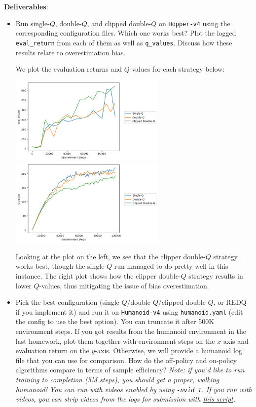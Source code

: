 \textbf{Deliverables}:
\begin{itemize}
    \item Run single-$Q$, double-$Q$, and clipped double-$Q$ on \verb|Hopper-v4| using the corresponding configuration files. Which one works best? Plot the logged \verb|eval_return| from each of them as well as \verb|q_values|. Discuss how these results relate to overestimation bias.
    
    \begin{sol}
        We plot the evaluation returns and $Q$-values for each strategy below:
        \begin{center}
            \includegraphics[width=3in]{../q3.1.5_hopper_evalreturn.png}
            \hspace{0.25cm}
            \includegraphics[width=3in]{../q3.1.5_hopper_qvalues.png}
        \end{center}
        Looking at the plot on the left, we see that the clipper double-$Q$ strategy works best, though the single-$Q$ run managed to do pretty well in this instance. The right plot shows how the clipper double-$Q$ strategy results in lower $Q$-values, thus mitigating the issue of bias overestimation.
    \end{sol}

    \item Pick the best configuration (single-$Q$/double-$Q$/clipped double-$Q$, or REDQ if you implement it) and run it on \verb|Humanoid-v4| using \verb|humanoid.yaml| (edit the config to use the best option). You can truncate it after 500K environment steps. If you got results from the humanoid environment in the last homework, plot them together with environment steps on the $x$-axis and evaluation return on the $y$-axis. Otherwise, we will provide a humanoid log file that you can use for comparison. How do the off-policy and on-policy algorithms compare in terms of sample efficiency? \textit{Note: if you'd like to run training to completion (5M steps), you should get a proper, walking humanoid! You can run with videos enabled by using \texttt{-nvid 1}. If you run with videos, you can strip videos from the logs for submission with \href{https://gist.github.com/kylestach/e9964f5f34ee74367547dec83eaf5fae}{this script}.}


\end{itemize}
